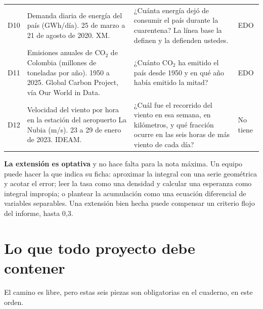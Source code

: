 \documentclass[12pt,letterpaper]{article}
\begin{document}
{\begin{longtable}{L{0.7cm}L{4.1cm}L{7.3cm}L{2.6cm}}
D10 & Demanda diaria de energía del país (GWh/día). 25 de marzo a 21 de agosto de 2020. XM. & ¿Cuánta energía dejó de consumir el país durante la cuarentena? La línea base la definen y la defienden ustedes. & EDO\\
D11 & Emisiones anuales de CO$_2$ de Colombia (millones de toneladas por año). 1950 a 2025. Global Carbon Project, vía Our World in Data. & ¿Cuánto CO$_2$ ha emitido el país desde 1950 y en qué año había emitido la mitad? & EDO\\
D12 & Velocidad del viento por hora en la estación del aeropuerto La Nubia (m/s). 23 a 29 de enero de 2023. IDEAM. & ¿Cuál fue el recorrido del viento en esa semana, en kilómetros, y qué fracción ocurre en las seis horas de más viento de cada día? & No tiene\\
\bottomrule
\end{longtable}}

\textbf{La extensión es optativa} y no hace falta para la nota máxima. Un equipo puede hacer la que indica su ficha: aproximar la integral con una serie geométrica y acotar el error; leer la tasa como una densidad y calcular una esperanza como integral impropia; o plantear la acumulación como una ecuación diferencial de variables separables. Una extensión bien hecha puede compensar un criterio flojo del informe, hasta 0,3.

\section{Lo que todo proyecto debe contener}
El camino es libre, pero estas seis piezas son obligatorias en el cuaderno, en este orden.
\end{document}
